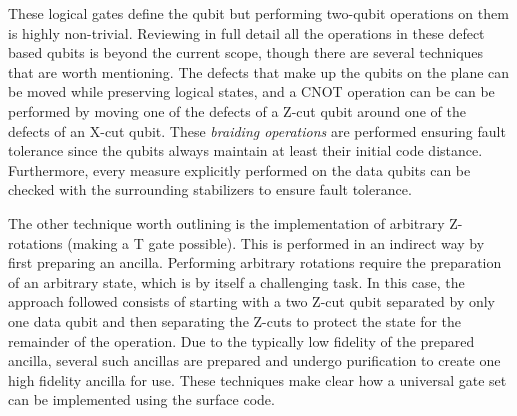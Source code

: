 These logical gates define the qubit but performing two-qubit operations on them
is highly non-trivial. Reviewing in full detail all the operations in these
defect based qubits is beyond the current scope, though there are several
techniques that are worth mentioning. The defects that make up the qubits on the
plane can be moved while preserving logical states, and a CNOT operation can be
can be performed by moving one of the defects of a Z-cut qubit around one of the
defects of an X-cut qubit. These \textit{ braiding operations } are performed
ensuring fault tolerance since the qubits always maintain at least their initial
code distance. Furthermore, every measure explicitly performed on the data
qubits can be checked with the surrounding stabilizers to ensure fault
tolerance.

The other technique worth outlining is the implementation of arbitrary
Z-rotations (making a T gate possible). This is performed in an indirect way by
first preparing an ancilla. Performing arbitrary rotations require the
preparation of an arbitrary state, which is by itself a challenging task. In
this case, the approach followed consists of starting with a two Z-cut qubit
separated by only one data qubit and then separating the Z-cuts to protect the
state for the remainder of the operation. Due to the typically low fidelity of
the prepared ancilla, several such ancillas are prepared and undergo
purification to create one high fidelity ancilla for use. These techniques make
clear how a universal gate set can be implemented using the surface code.


